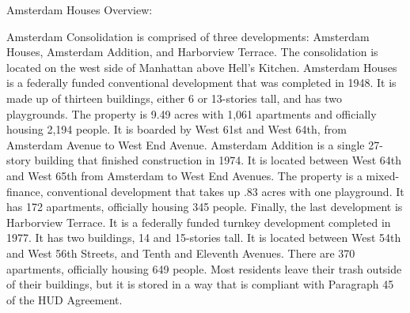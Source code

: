 Amsterdam Houses Overview: 

 

Amsterdam Consolidation is comprised of three developments: Amsterdam Houses, Amsterdam Addition, and Harborview Terrace. The consolidation is located on the west side of Manhattan above Hell's Kitchen. Amsterdam Houses is a federally funded conventional development that was completed in 1948. It is made up of thirteen buildings, either 6 or 13-stories tall, and has two playgrounds. The property is 9.49 acres with 1,061 apartments and officially housing 2,194 people. It is boarded by West 61st and West 64th, from Amsterdam Avenue to West End Avenue. Amsterdam Addition is a single 27-story building that finished construction in 1974. It is located between West 64th and West 65th from Amsterdam to West End Avenues. The property is a mixed-finance, conventional development that takes up .83 acres with one playground. It has 172 apartments, officially housing 345 people. Finally, the last development is Harborview Terrace. It is a federally funded turnkey development completed in 1977. It has two buildings, 14 and 15-stories tall. It is located between West 54th and West 56th Streets, and Tenth and Eleventh Avenues. There are 370 apartments, officially housing 649 people. Most residents leave their trash outside of their buildings, but it is stored in a way that is compliant with Paragraph 45 of the HUD Agreement.